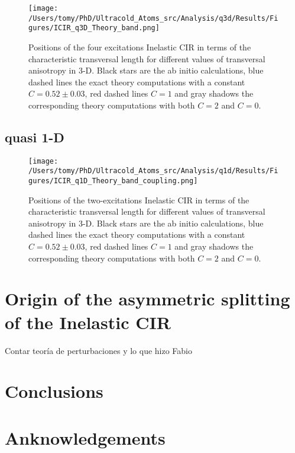\documentclass[aps,pre,twocolumn,superscriptaddress,showpacs]{revtex4-1}
\begin{document}
	\begin{figure}[htbp!]
	  \centering
	 \texttt{[image: /Users/tomy/PhD/Ultracold\_Atoms\_src/Analysis/q3d/Results/Figures/ICIR\_q3D\_Theory\_band.png]}
     	\caption{Positions of the four excitations Inelastic CIR in terms of the characteristic transversal length for different values of transversal anisotropy in 3-D. Black stars are the ab initio calculations, blue dashed lines the exact theory computations with a constant $C=0.52\pm0.03$, red dashed lines $C=1$ and gray shadows the corresponding theory computations with both $C=2$ and $C=0$. }
    	\label{fig:q3d ICIR}
	\end{figure}
	
\newpage
\subsection{quasi 1-D} \label{subsec:quasi 1-D}
\begin{figure}[htbp!]
   	 \centering
    	\texttt{[image: /Users/tomy/PhD/Ultracold\_Atoms\_src/Analysis/q1d/Results/Figures/ICIR\_q1D\_Theory\_band\_coupling.png]}
    	\caption{Positions of the two-excitations Inelastic CIR in terms of the characteristic transversal length for different values of transversal anisotropy in 3-D. Black stars are the ab initio calculations, blue dashed lines the exact theory computations with a constant $C=0.52\pm0.03$, red dashed lines $C=1$ and gray shadows the corresponding theory computations with both $C=2$ and $C=0$.}
    	\label{fig:q1D ICIR}
	\end{figure}
\newpage
\section{Origin of the asymmetric splitting of the Inelastic CIR} \label{sec:perturbation}
Contar teoría de perturbaciones y lo que hizo Fabio

\section{Conclusions}
\section*{Anknowledgements}



\newpage
\end{document}

